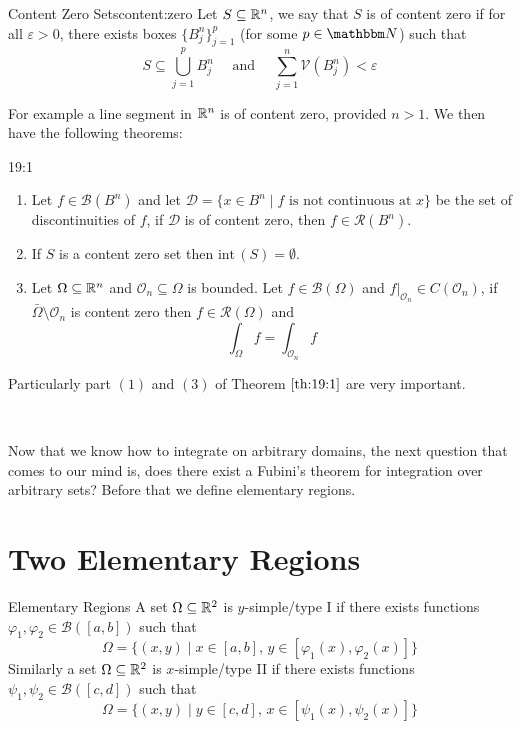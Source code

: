 \documentclass[../Analysis-3.tex]{subfiles}
\begin{document}
\begin{Def}{Content Zero Sets}{content:zero}
  Let $S \subseteq \mathbb{R}^n$, we say that $S$ is of content zero if for all $\varepsilon > 0$, there exists boxes $\{ B_j^n \}_{j=1}^p$ (for some $p \in \N$) such that
  \[
    S \subseteq \bigcup_{j=1}^p B_j^n \quad \mbox{ and } \quad \sum_{j=1}^n \mathcal{V}(B^n_j) < \varepsilon
  \]
\end{Def}

For example a line segment in $\mathbb{R}^n$ is of content zero, provided $n > 1$. We then have the following theorems:

\begin{Thm}{}{19:1}
  \begin{enumerate}
    \item Let $f \in \mathscr{B}(B^n)$ and let $\mathcal{D} = \{ x \in B^n \mid f \mbox{ is not continuous at } x \}$ be the set of discontinuities of $f$, if $\mathcal{D}$ is of content zero, then $f \in \mathscr{R}(B^n)$.

    \item If $S$ is a content zero set then $\mathrm{int}\,(S) = \emptyset$.

    \item Let $\Omega \subseteq \mathbb{R}^n$ and $\mathcal{O}_n \subseteq \Omega$ is bounded. Let $f \in \mathscr{B}(\Omega)$ and $f\vert_{\mathcal{O}_n} \in C(\mathcal{O}_n)$, if $\bar{\Omega}\setminus \mathcal{O}_n$ is content zero then $f \in \mathscr{R}(\Omega)$ and
          \[
            \int_{\Omega} f = \int_{\mathcal{O}_n} f
          \]
  \end{enumerate}
\end{Thm}
Particularly part $(1)$ and $(3)$ of Theorem $\ref{th:19:1}$ are very important.

\

Now that we know how to integrate on arbitrary domains, the next question that comes to our mind is, does there exist a Fubini's theorem for integration over arbitrary sets? Before that we define elementary regions.

\section{Two Elementary Regions}

\begin{Def}{Elementary Regions}{}
  A set $\Omega \subseteq \mathbb{R}^2$ is $y$-simple/type I if there exists functions $\varphi_1, \varphi_2 \in \mathscr{B}([a,b])$ such that
  \[
    \Omega = \{ (x,y) \mid x \in [a,b], \, y \in [\varphi_1(x), \varphi_2(x)] \}
  \]
  Similarly a set $\Omega \subseteq \mathbb{R}^2$ is $x$-simple/type II if there exists functions $\psi_1, \psi_2 \in \mathscr{B}([c,d])$ such that
  \[
    \Omega = \{ (x,y) \mid y \in [c,d], \, x \in [ \psi_1(x), \psi_2(x) ] \}
  \]
\end{Def}
\end{document}
